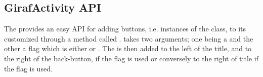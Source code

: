 \subsection{GirafActivity API}

The  provides an easy API for adding \giraf buttons, i.e. instances of the  class, to its customized  through a method called .  takes two arguments; one being a  and the other a flag which is either  or . The  is then added to the left of the title, and to the right of the back-button, if the  flag is used or conversely to the right of title if the  flag is used.       
